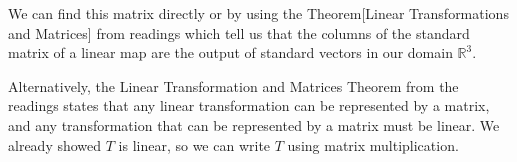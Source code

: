 \begin{SaveQuestion}
\begin{enumerate}
      We can find this matrix directly or by using the Theorem[Linear Transformations and Matrices] from readings which tell us that the columns of the standard matrix of a linear map are the output of standard vectors in our domain $\mathbb{R}^3$. 
      
      Alternatively, the Linear Transformation and Matrices Theorem from the readings states that any linear transformation can be represented by a matrix, and any transformation that can be represented by a matrix must be linear. We already showed $T$ is linear, so we can write $T$ using matrix multiplication. 

        
         
  \end{enumerate}
\end{SaveQuestion}


